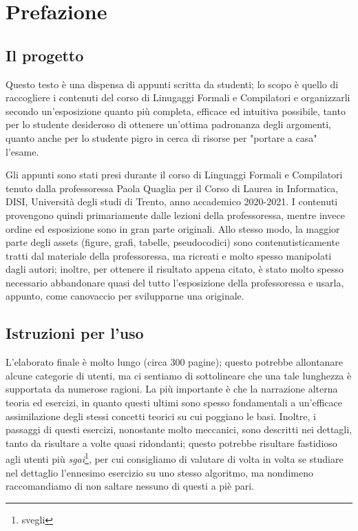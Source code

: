 \documentclass[class=book, crop=false, oneside, 12pt]{standalone}
\begin{document}
\chapter*{Prefazione}

\section*{Il progetto}
Questo testo è una dispensa di appunti scritta da studenti; lo scopo è quello di raccogliere i contenuti del corso di Linugaggi Formali e Compilatori e organizzarli secondo un'esposizione quanto più completa, efficace ed intuitiva possibile, tanto per lo studente desideroso di ottenere un'ottima padronanza degli argomenti, quanto anche per lo studente pigro in cerca di risorse per "portare a casa" l'esame.

Gli appunti sono stati presi durante il corso di Linguaggi Formali e Compilatori tenuto dalla professoressa Paola Quaglia per il Corso di Laurea in Informatica, DISI, Università degli studi di Trento, anno accademico 2020-2021. I contenuti provengono quindi primariamente dalle lezioni della professoressa, mentre invece ordine ed esposizione sono in gran parte originali. Allo stesso modo, la maggior parte degli assets (figure, grafi, tabelle, pseudocodici) sono contenutisticamente tratti dal materiale della professoressa, ma ricreati e molto spesso manipolati dagli autori; inoltre, per ottenere il risultato appena citato, è stato molto spesso necessario abbandonare quasi del tutto l'esposizione della professoressa e usarla, appunto, come canovaccio per svilupparne una originale.

\section*{Istruzioni per l'uso}
L'elaborato finale è molto lungo (circa 300 pagine); questo potrebbe allontanare alcune categorie di utenti, ma ci sentiamo di sottolineare che una tale lunghezza è supportata da numerose ragioni. La più importante è che la narrazione alterna teoria ed esercizi, in quanto questi ultimi sono spesso fondamentali a un'efficace assimilazione degli stessi concetti teorici su cui poggiano le basi. Inoltre, i passaggi di questi esercizi, nonostante molto meccanici, sono descritti nei dettagli, tanto da risultare a volte quasi ridondanti; questo potrebbe risultare fastidioso agli utenti più \emph{sgai}\footnote{svegli}, per cui consigliamo di valutare di volta in volta se studiare nel dettaglio l'ennesimo esercizio su uno stesso algoritmo, ma nondimeno raccomandiamo di non saltare nessuno di questi a piè pari. 
\end{document}
